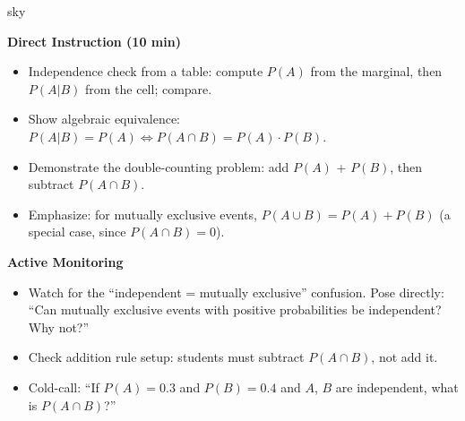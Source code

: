 \documentclass[10pt]{article}
\begin{document}
\begin{skillbox}{sky}
\begin{minipage}[t]{0.48\linewidth}
    \textbf{Direct Instruction (10 min)}
    \begin{itemize}
        \item Independence check from a table: compute $P(A)$ from the marginal,
              then $P(A|B)$ from the cell; compare.
        \item Show algebraic equivalence: $P(A|B) = P(A) \Leftrightarrow
              P(A \cap B) = P(A) \cdot P(B)$.
        \item Demonstrate the double-counting problem: add $P(A)$ + $P(B)$, then
              subtract $P(A \cap B)$.
        \item Emphasize: for mutually exclusive events, $P(A \cup B) = P(A) + P(B)$
              (a special case, since $P(A \cap B) = 0$).
    \end{itemize}
\end{minipage}
\hfill
\begin{minipage}[t]{0.48\linewidth}
    \textbf{Active Monitoring}
    \begin{itemize}
        \item Watch for the ``independent = mutually exclusive'' confusion.
              Pose directly: ``Can mutually exclusive events with positive probabilities
              be independent? Why not?''
        \item Check addition rule setup: students must subtract $P(A \cap B)$,
              not add it.
        \item Cold-call: ``If $P(A) = 0.3$ and $P(B) = 0.4$ and $A$, $B$ are
              independent, what is $P(A \cap B)$?''
    \end{itemize}
\end{minipage}
\end{skillbox}
\end{document}
